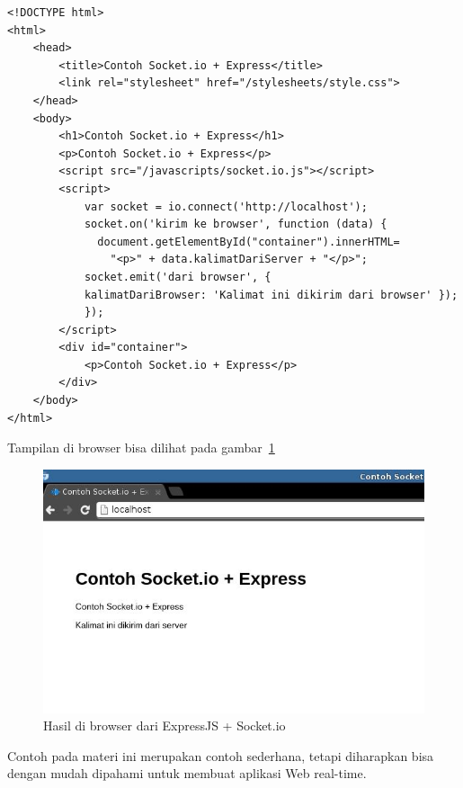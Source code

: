 \lstset{language=html,caption=Kode sumber di browser}
\begin{lstlisting}
<!DOCTYPE html>
<html>
	<head>
		<title>Contoh Socket.io + Express</title>
		<link rel="stylesheet" href="/stylesheets/style.css">
	</head>
	<body>
		<h1>Contoh Socket.io + Express</h1>
		<p>Contoh Socket.io + Express</p>
		<script src="/javascripts/socket.io.js"></script>
		<script>
			var socket = io.connect('http://localhost');
			socket.on('kirim ke browser', function (data) {
			  document.getElementById("container").innerHTML=
			    "<p>" + data.kalimatDariServer + "</p>";
			socket.emit('dari browser', { 
		    kalimatDariBrowser: 'Kalimat ini dikirim dari browser' });
			});
		</script>
		<div id="container">
			<p>Contoh Socket.io + Express</p>
		</div>
	</body>
</html>
\end{lstlisting}

Tampilan di browser bisa dilihat pada gambar~\ref{fig:socket-io-express}

  \begin{figure}
    \begin{center}
      \includegraphics[scale=0.5]{images/socket-io-expressjs.jpg}
    \end{center}
    \caption{Hasil di browser dari ExpressJS + Socket.io}
    \label{fig:socket-io-express}
  \end{figure}

Contoh pada materi ini merupakan contoh sederhana, tetapi diharapkan bisa dengan mudah dipahami untuk membuat aplikasi Web real-time. 
